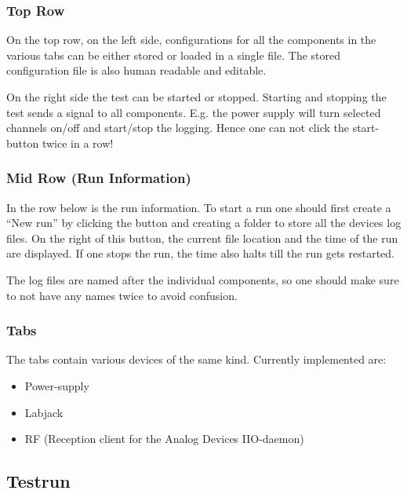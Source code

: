 \documentclass[10pt,a4paper]{article}
\begin{document}
	\subsubsection{Top Row}	
	
	On the top row, on the left side, configurations for all the components in the various tabs can be either stored or loaded in a single file. The stored configuration file is also human readable and editable.
	
	\bigbreak
	
	On the right side the test can be started or stopped. Starting and stopping the test sends a signal to all components. E.g. the power supply will turn selected channels on/off and start/stop the logging. Hence one can not click the start-button twice in a row!
	
	\subsubsection{Mid Row (Run Information)}
	
	In the row below is the run information. To start a run one should first create a \enquote{New run} by clicking the button and creating a folder to store all the devices log files. On the right of this button, the current file location and the time of the run are displayed. If one stops the run, the time also halts till the run gets restarted. 

	\bigbreak	
	
	The log files are named after the individual components, so one should make sure to not have any names twice to avoid confusion.
	
	\subsubsection{Tabs}
	
	The tabs contain various devices of the same kind. Currently implemented are:
	
	\begin{itemize}
\item Power-supply
\item Labjack
\item RF (Reception client for the Analog Devices IIO-daemon)
	\end{itemize}		
	
	\subsection{Testrun}	
	
\end{document}
